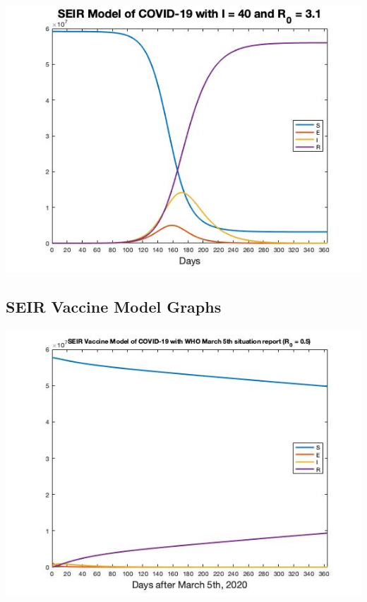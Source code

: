 \documentclass[12pt, a4paper]{article}
\begin{document}
    \includegraphics[scale=0.75]{plots/seir40(3.1).jpg}
    
    \subsection{SEIR Vaccine Model Graphs}
    

    
    
    
    
    
    
    \includegraphics[scale=0.75]{plots/whoseirv5.jpg}
    
\end{document}
